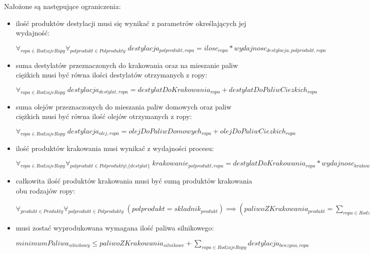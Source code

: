 \documentclass[polish,12pt,titlepage]{article}
\begin{document}
Nałożone są następujące ograniczenia:
\begin{itemize}
    \item ilość produktów destylacji musi się wynikać z parametrów określających jej wydajność:
    \begin{center}
    $\forall_{ropa \in RodzajeRopy} \forall_{polprodukt \in Polprodukty} \; destylacja_{polprodukt,ropa} = ilosc_{ropa} * wydajnosc_{destylacja,polprodukt,ropa} $
    \end{center}
    
    \item suma destylatów przeznaczonych do krakowania oraz na mieszanie paliw ciężkich musi być równa ilości destylatów otrzymanych z ropy:
    \begin{center}
    $\forall_{ropa \in RodzajeRopy} \; destylacja_{destylat,ropa} = destylatDoKrakowania_{ropa} + destylatDoPaliwCiezkich_{ropa}$
    \end{center}

    \item suma olejów przeznaczonych do mieszania paliw domowych oraz paliw ciężkich musi być równa ilość olejów otrzymanych z ropy:
    \begin{center}
    $\forall_{ropa \in RodzajeRopy} \; destylacja_{olej,ropa} = olejDoPaliwDomowych_{ropa} + olejDoPaliwCiezkich_{ropa}$
    \end{center}

    \item ilość produktów krakowania musi wynikać z wydajności procesu:
    \begin{center}
    $\forall_{ropa \in RodzajeRopy} \forall_{polprodukt \in Polprodukty \setminus \{destylat\}} \; krakowanie_{polprodukt,ropa} = destylatDoKrakowania_{ropa} * wydajnosc_{krakowanie,polprodukt,ropa}$
    \end{center}

    \item całkowita ilość produktów krakowania musi być sumą produktów krakowania obu rodzajów ropy:
    \begin{center}
    $\forall_{produkt \in Produkty} \forall_{polprodukt \in Polprodukty} \; (polprodukt = skladnik_{produkt}) \implies (paliwoZKrakowania_{produkt} = \sum_{ropa \in RodzajeRopy} krakowanie_{ropa,polprodukt})$
    \end{center}

    \item musi zostać wyprodukowana wymagana ilość paliwa silnikowego:
    \begin{center}
    $minimumPaliwa_{silnikowy} \leq paliwoZKrakowania_{silnikowe} + \sum_{ropa \in RodzajeRopy} destylacja_{benzyna,ropa}$
    \end{center}


\end{itemize}
\end{document}
